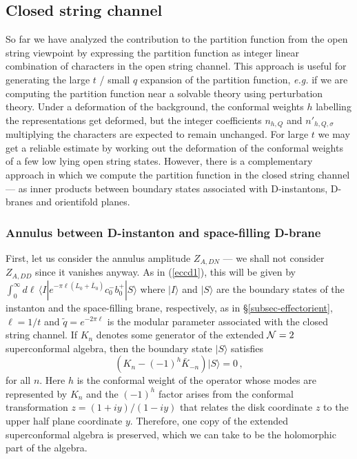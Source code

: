 \documentclass[12pt,a4paper]{article}
\newcommand{\be}{\begin{equation}}
\newcommand{\ee}{\end{equation}}
\newcommand{\refb}[1]{(\ref{#1})}
\newcommand{\NN}{{\cal N}}
\def\tn{n'}
\begin{document}
\subsection{Closed string channel} \label{sE4}

So far we have analyzed the contribution to the partition function from the
open string viewpoint by expressing the partition function as  integer linear
combination of characters in the open string channel.
This approach is useful for generating the large $t$ / small $q$ expansion of the partition function, {\it e.g.}
if we are computing the partition function near a solvable theory using perturbation theory.
Under a deformation of the background,
the conformal weights $h$ labelling the representations get deformed, but the integer
coefficients $n_{h,Q}$ and $\tn_{h,Q,\sigma}$
multiplying the characters are expected to remain unchanged.
For large $t$ we may get a reliable estimate by working out the deformation of the conformal
weights of a few low lying open string states.
However, there is a complementary approach in  which
we compute the partition function in the closed string
channel \cite{Ooguri:1996ck,Recknagel:1997sb} --- as inner products between boundary
states associated with D-instantons, D-branes and orientifold planes.

\subsubsection{Annulus between D-instanton and space-filling D-brane}
\label{sE-closed-DN}

First, let us consider the annulus amplitude $Z_{A,DN}$ --- we shall not consider $Z_{A,DD}$
since it vanishes anyway. As in \refb{eccd1},
this will be given by $\int_0^\infty d\ell \,\langle I|e^{-\pi\ell(L_0+\bar L_0)}c_0^- b_0^+ |S\rangle$
where $|I\rangle$ and $|S\rangle$ are the boundary states of the instanton and the space-filling brane, respectively,
as in \S\ref{subsec-effectorient}, $\ell=1/t$ and
$\tilde q=e^{-2\pi \ell}$ is the modular parameter associated with the closed string channel.
If $K_n$ denotes some generator of the extended $\NN=2$ superconformal algebra, then the
boundary state $|S\rangle$ satisfies
\be \label{eboundarystate}
(K_n- (-1)^h \bar K_{-n})|S\rangle=0\, ,
\ee
for all $n$. Here $h$ is the conformal weight of the operator whose modes are represented by
$K_n$ and the $(-1)^h$ factor arises from the conformal transformation $z = (1+iy)/(1-iy)$
that relates the disk coordinate $z$ to the upper half plane coordinate $y$.
Therefore, one copy of the extended superconformal algebra is preserved,
which we can take to be the holomorphic part of the algebra.
\end{document}

